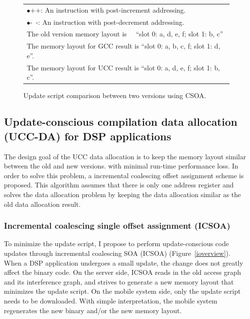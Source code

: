\begin{figure}[htbp]
\begin{small}
\begin{center}
\begin{tabular}{|c|c||l||l|l||l|l|}
\multicolumn{7}{l}{$\bullet$++: An instruction with post-increment addressing.}\\
\multicolumn{7}{l}{$\bullet$-~-: An instruction with post-decrement addressing.}\\
\multicolumn{7}{l}{The old version memory layout is ~~``slot 0: a, d, e, f; slot 1: b, c''}\\
\multicolumn{7}{l}{The memory layout for GCC result is ``slot 0: a, b, c, f; slot 1: d, e''.}\\
\multicolumn{7}{l}{The memory layout for UCC result is ``slot 0: a, d, e, f; slot 1: b, c''.}
\end{tabular}
\end{center}
\end{small}
\caption{Update script comparison between two versions using CSOA.}
\label{recomdiff}
\end{figure}%

\subsection{Update-conscious compilation data allocation (UCC-DA) for DSP applications}
The design goal of the UCC data allocation is to keep the memory layout similar between the old and new versions.
with minimal run-time performance loss.
In order to solve this problem, a incremental coalescing offset assignment scheme is proposed. This algorithm 
assumes that there is only one address register and solves the data allocation problem
by keeping the data allocation similar as the old data allocation result.


\subsubsection{Incremental coalescing single offset assignment (ICSOA)}


To minimize the update script, I propose to perform update-conscious code updates through incremental coalescing SOA (ICSOA) (Figure~\ref{ioverview}). When a DSP application undergoes a small update, the change does not greatly affect the binary code. On the server side, ICSOA reads in the old access graph and its interference graph, and strives to generate a new memory layout that minimizes the update script. On the mobile system side, only the update script needs to be downloaded. With simple interpretation, the mobile system  regenerates the new binary and/or the new memory layout.

